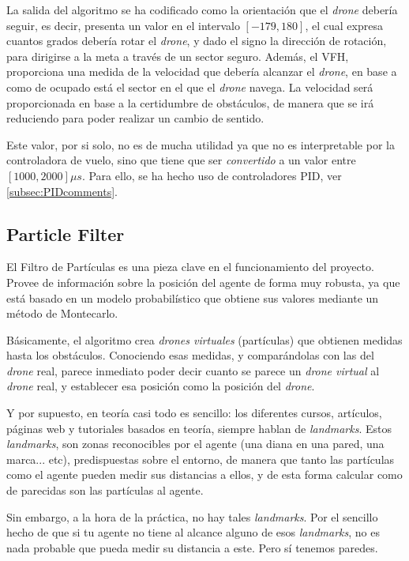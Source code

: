La salida del algoritmo se ha codificado como la orientación que el \emph{drone} debería seguir, es decir, presenta un valor en el intervalo $[-179, 180]$, el cual expresa cuantos grados debería rotar el \emph{drone}, y dado el signo la dirección de rotación, para dirigirse a la meta a través de un sector seguro. 
Además, el VFH, proporciona una medida de la velocidad que debería alcanzar el \emph{drone}, en base a como de ocupado está el sector en el que el \emph{drone} navega. La velocidad será proporcionada en base a la certidumbre de obstáculos, de manera que se irá reduciendo para poder realizar un cambio de sentido.

Este valor, por si solo, no es de mucha utilidad ya que no es interpretable por la controladora de vuelo, sino que tiene que ser \textit{convertido} a un valor entre $[1000, 2000]\mu s$. Para ello, se ha hecho uso de controladores PID, ver \ref{subsec:PIDcomments}.

\subsection{Particle Filter}
\label{subsec:PFcomments}
El Filtro de Partículas es una pieza clave en el funcionamiento del proyecto. Provee de información sobre la posición del agente de forma muy robusta, ya que está basado en un modelo probabilístico que obtiene sus valores mediante un método de Montecarlo. 

Básicamente, el algoritmo crea \emph{drones virtuales} (partículas) que obtienen medidas hasta los obstáculos. Conociendo esas medidas, y comparándolas con las del \emph{drone} real, parece inmediato poder decir cuanto se parece un \emph{drone virtual} al \emph{drone} real, y establecer esa posición como la posición del \emph{drone}. 

Y por supuesto, en teoría casi todo es sencillo: los diferentes cursos, artículos, páginas web y tutoriales basados en teoría, siempre hablan de \emph{landmarks}. Estos \emph{landmarks}, son zonas reconocibles por el agente (una diana en una pared, una marca... etc), predispuestas sobre el entorno, de manera que tanto las partículas como el agente pueden medir sus distancias a ellos, y de esta forma calcular como de parecidas son las partículas al agente. 

Sin embargo, a la hora de la práctica, no hay tales \emph{landmarks}. Por el sencillo hecho de que si tu agente no tiene al alcance alguno de esos \emph{landmarks}, no es nada probable que pueda medir su distancia a este. Pero sí tenemos paredes. 

